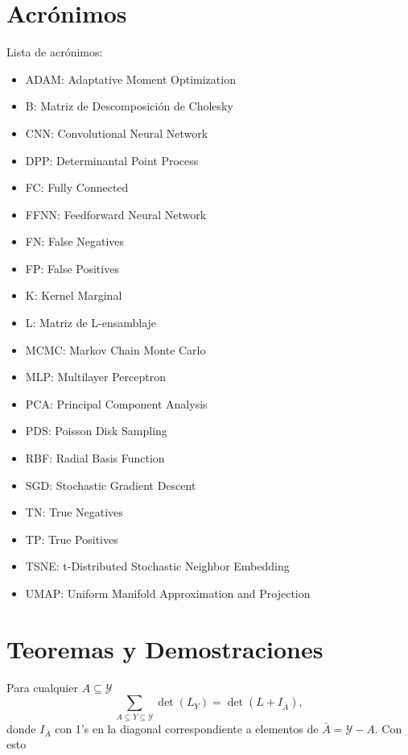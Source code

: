 \begin{appendixs}

    \section{Acrónimos}
    
    Lista de acrónimos: 
    
    \begin{itemize}
        \item ADAM: Adaptative Moment Optimization
        \item B: Matriz de Descomposición de Cholesky 
        \item CNN: Convolutional Neural Network
        \item DPP: Determinantal Point Process 
        \item FC: Fully Connected
        \item FFNN: Feedforward Neural Network
        \item FN: False Negatives
        \item FP: False Positives
        \item K: Kernel Marginal 
        \item L: Matriz de L-ensamblaje 
        \item MCMC: Markov Chain Monte Carlo
        \item MLP: Multilayer Perceptron
        \item PCA: Principal Component Analysis
        \item PDS: Poisson Disk Sampling
        \item RBF: Radial Basis Function
        \item SGD: Stochastic Gradient Descent
        \item TN: True Negatives
        \item TP: True Positives
        \item TSNE: t-Distributed Stochastic Neighbor Embedding
        \item UMAP: Uniform Manifold Approximation and Projection
        
    \end{itemize}


    \section{Teoremas y Demostraciones}
    
    \begin{teo} \hypertarget{Teorema .1}{}
    Para cualquier $A \subseteq \mathcal{Y}$ 
    \[ \sum_{A \subseteq Y \subseteq \mathcal{Y}}\det(L_Y) = \det(L + I_{\bar{A}}) ,  \]
    donde $I_{\bar{A}}$ con 1's en la diagonal correspondiente a elementos de $\bar{A} = \mathcal{Y} - A$. Con esto 
    

\end{teo}
\end{appendixs}
